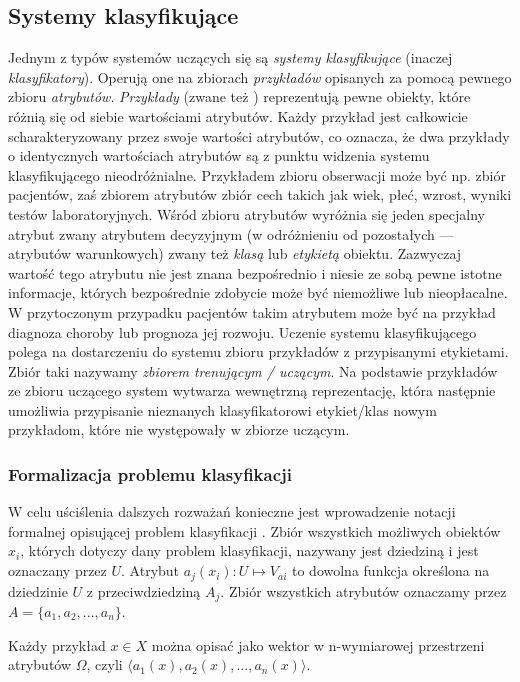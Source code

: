 \subsection{Systemy klasyfikujące}
Jednym z typów systemów uczących się są \emph{systemy klasyfikujące} (inaczej \emph{klasyfikatory}). Operują one na zbiorach \emph{przykładów} opisanych za pomocą pewnego zbioru \emph{atrybutów}.
\emph{Przykłady} (zwane też ) reprezentują pewne obiekty, które różnią się od siebie wartościami atrybutów. Każdy przykład jest całkowicie scharakteryzowany przez swoje wartości atrybutów, co oznacza, że dwa przykłady o identycznych wartościach atrybutów są z punktu widzenia systemu klasyfikującego nieodróżnialne. Przykładem zbioru obserwacji może być np. zbiór pacjentów, zaś zbiorem atrybutów zbiór cech takich jak wiek, płeć, wzrost, wyniki testów laboratoryjnych.
Wśród zbioru atrybutów wyróżnia się jeden specjalny atrybut zwany atrybutem decyzyjnym (w odróżnieniu od pozostałych --- atrybutów warunkowych) zwany też \emph{klasą} lub \emph{etykietą} obiektu.
Zazwyczaj wartość tego atrybutu nie jest znana bezpośrednio i niesie ze sobą pewne istotne informacje, których bezpośrednie zdobycie może być niemożliwe lub nieopłacalne. W przytoczonym przypadku pacjentów takim atrybutem może być na przykład diagnoza choroby lub prognoza jej rozwoju.
Uczenie systemu klasyfikującego polega na dostarczeniu do systemu zbioru przykładów z przypisanymi etykietami. Zbiór taki nazywamy \emph{zbiorem trenującym / uczącym}. Na podstawie przykładów ze zbioru uczącego system wytwarza wewnętrzną reprezentację, która następnie umożliwia przypisanie nieznanych klasyfikatorowi etykiet/klas nowym przykładom, które nie występowały w zbiorze uczącym.

\subsubsection{Formalizacja problemu klasyfikacji}
W celu uściślenia dalszych rozważań konieczne jest wprowadzenie notacji formalnej opisującej problem klasyfikacji \cite{krawiec2003uczenie}.
Zbiór wszystkich możliwych obiektów $ x_i $, których dotyczy dany problem klasyfikacji, nazywany jest dziedziną i jest oznaczany przez $ U $.
Atrybut $ a_j(x_i): U \mapsto V_{ai} $ to dowolna funkcja określona na dziedzinie $ U $ z przeciwdziedziną $ A_j $. Zbiór wszystkich atrybutów oznaczamy przez $ A = \{ a_1, a_2,..., a_n \} $.

Każdy przykład $ x \in X $ można opisać jako wektor w n-wymiarowej przestrzeni atrybutów $ \Omega $, czyli $ \langle a_1(x), a_2(x),...,a_n(x) \rangle $.

